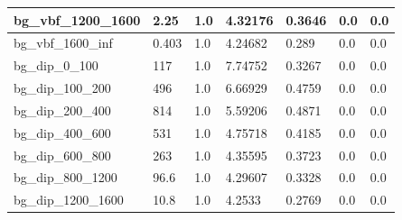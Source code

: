 \documentclass[a4paper, 10pt]{article}
\begin{document}
\begin{table}[H]
\begin{center}
\begin{tabular}{|m{23.0mm}|m{23.0mm}|m{18.0mm}|m{19.0mm}|m{19.0mm}|m{19.0mm}|m{19.0mm}|}
      \hline
      {\cellcolor{white}         bg\_vbf\_1200\_1600}& {\cellcolor{white}         2.25}& {\cellcolor{white}         1.0}& {\cellcolor{white}         4.32176}& {\cellcolor{white}         0.3646}& {\cellcolor{green}         0.0}& {\cellcolor{green}         0.0}\\
      \hline
      {\cellcolor{white}         bg\_vbf\_1600\_inf}& {\cellcolor{white}         0.403}& {\cellcolor{white}         1.0}& {\cellcolor{white}         4.24682}& {\cellcolor{white}         0.289}& {\cellcolor{green}         0.0}& {\cellcolor{green}         0.0}\\
      \hline
      {\cellcolor{white}         bg\_dip\_0\_100}& {\cellcolor{white}         117}& {\cellcolor{white}         1.0}& {\cellcolor{white}         7.74752}& {\cellcolor{white}         0.3267}& {\cellcolor{green}         0.0}& {\cellcolor{green}         0.0}\\
      \hline
      {\cellcolor{white}         bg\_dip\_100\_200}& {\cellcolor{white}         496}& {\cellcolor{white}         1.0}& {\cellcolor{white}         6.66929}& {\cellcolor{white}         0.4759}& {\cellcolor{green}         0.0}& {\cellcolor{green}         0.0}\\
      \hline
      {\cellcolor{white}         bg\_dip\_200\_400}& {\cellcolor{white}         814}& {\cellcolor{white}         1.0}& {\cellcolor{white}         5.59206}& {\cellcolor{white}         0.4871}& {\cellcolor{green}         0.0}& {\cellcolor{green}         0.0}\\
      \hline
      {\cellcolor{white}         bg\_dip\_400\_600}& {\cellcolor{white}         531}& {\cellcolor{white}         1.0}& {\cellcolor{white}         4.75718}& {\cellcolor{white}         0.4185}& {\cellcolor{green}         0.0}& {\cellcolor{green}         0.0}\\
      \hline
      {\cellcolor{white}         bg\_dip\_600\_800}& {\cellcolor{white}         263}& {\cellcolor{white}         1.0}& {\cellcolor{white}         4.35595}& {\cellcolor{white}         0.3723}& {\cellcolor{green}         0.0}& {\cellcolor{green}         0.0}\\
      \hline
      {\cellcolor{white}         bg\_dip\_800\_1200}& {\cellcolor{white}         96.6}& {\cellcolor{white}         1.0}& {\cellcolor{white}         4.29607}& {\cellcolor{white}         0.3328}& {\cellcolor{green}         0.0}& {\cellcolor{green}         0.0}\\
      \hline
      {\cellcolor{white}         bg\_dip\_1200\_1600}& {\cellcolor{white}         10.8}& {\cellcolor{white}         1.0}& {\cellcolor{white}         4.2533}& {\cellcolor{white}         0.2769}& {\cellcolor{green}         0.0}& {\cellcolor{green}         0.0}\\

\end{tabular}
\end{center}
\end{table}
\end{document}
